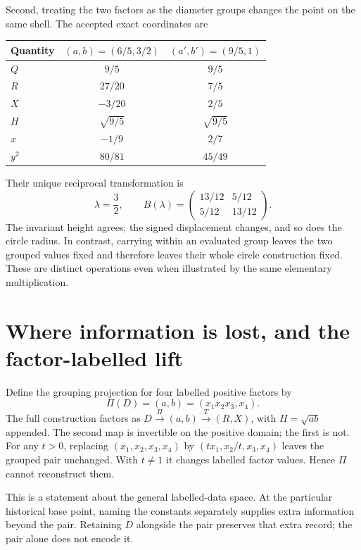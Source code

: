 \documentclass[11pt,a4paper]{article}
\begin{document}
Second, treating the two factors as the diameter groups changes the point on the same shell. The accepted exact coordinates are
\begin{center}
\begin{tabular}{@{}lcc@{}}
\toprule
Quantity & $(a,b)=(6/5,3/2)$ & $(a',b')=(9/5,1)$\\
\midrule
$Q$ & $9/5$ & $9/5$\\
$R$ & $27/20$ & $7/5$\\
$X$ & $-3/20$ & $2/5$\\
$H$ & $\sqrt{9/5}$ & $\sqrt{9/5}$\\
$x$ & $-1/9$ & $2/7$\\
$y^2$ & $80/81$ & $45/49$\\
\bottomrule
\end{tabular}
\end{center}
Their unique reciprocal transformation is
\begin{equation}
 \lambda=\frac32,\qquad
 B(\lambda)=\begin{pmatrix}13/12&5/12\\5/12&13/12\end{pmatrix}.
 \label{eq:rationalboost}
\end{equation}
The invariant height agrees; the signed displacement changes, and so does the circle radius. In contrast, carrying within an evaluated group leaves the two grouped values fixed and therefore leaves their whole circle construction fixed. These are distinct operations even when illustrated by the same elementary multiplication.

\section{Where information is lost, and the factor-labelled lift}
\label{sec:loss}
Define the grouping projection for four labelled positive factors by
\begin{equation}
 \Pi(D)=(a,b)=(x_1x_2x_3,x_4).
 \label{eq:projection}
\end{equation}
The full construction factors as $D\xrightarrow{\Pi}(a,b)\xrightarrow{T}(R,X)$, with $H=\sqrt{ab}$ appended. The second map is invertible on the positive domain; the first is not. For any $t>0$, replacing $(x_1,x_2,x_3,x_4)$ by $(t x_1,x_2/t,x_3,x_4)$ leaves the grouped pair unchanged. With $t\ne1$ it changes labelled factor values. Hence $\Pi$ cannot reconstruct them.

This is a statement about the general labelled-data space. At the particular historical base point, naming the constants separately supplies extra information beyond the pair. Retaining $D$ alongside the pair preserves that extra record; the pair alone does not encode it.
\end{document}
